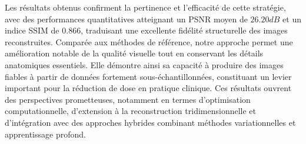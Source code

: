 Les résultats obtenus confirment la pertinence et l'efficacité de cette stratégie, avec des performances quantitatives atteignant un PSNR moyen de $26.20dB$ et un indice SSIM de $0.866$, traduisant une excellente fidélité structurelle des images reconstruites. Comparée aux méthodes de référence, notre approche permet une amélioration notable de la qualité visuelle tout en conservant les détails anatomiques essentiels. Elle démontre ainsi sa capacité à produire des images fiables à partir de données fortement sous-échantillonnées, constituant un levier important pour la réduction de dose en pratique clinique. Ces résultats ouvrent des perspectives prometteuses, notamment en termes d'optimisation computationnelle, d'extension à la reconstruction tridimensionnelle et d'intégration avec des approches hybrides combinant méthodes variationnelles et apprentissage profond.

